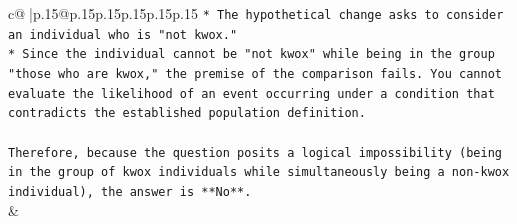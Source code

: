 \documentclass{article}
\begin{document}
{\begin{supertabular}{c@{$\;$}|p{.15\linewidth}@{}p{.15\linewidth}p{.15\linewidth}p{.15\linewidth}p{.15\linewidth}p{.15\linewidth}}
{{{\texttt{*   The hypothetical change asks to consider an individual who is "not kwox."} \\
\texttt{*   Since the individual cannot be "not kwox" while being in the group "those who are kwox," the premise of the comparison fails. You cannot evaluate the likelihood of an event occurring under a condition that contradicts the established population definition.} \\
\\ 
\texttt{Therefore, because the question posits a logical impossibility (being in the group of kwox individuals while simultaneously being a non{-}kwox individual), the answer is **No**.} \\
            }
        }
    }
    & \\ \\


\end{supertabular}}
\end{document}
